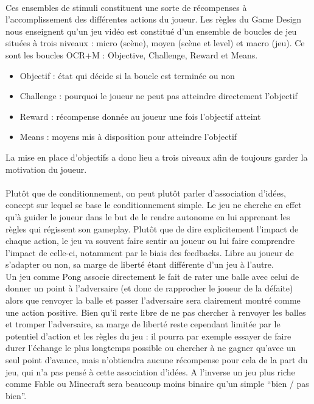 \paragraph{}
Ces ensembles de stimuli constituent une sorte de récompenses à l’accomplissement des différentes actions du joueur. Les règles du Game Design nous enseignent qu’un jeu vidéo est constitué d’un ensemble de boucles de jeu situées à trois niveaux : micro (scène), moyen (scène et level) et macro (jeu). Ce sont les boucles OCR+M : Objective, Challenge, Reward et Means.
\begin{itemize}
	\item Objectif : état qui décide si la boucle est terminée ou non
	\item Challenge : pourquoi le joueur ne peut pas atteindre directement l’objectif
	\item Reward : récompense donnée au joueur une fois l’objectif atteint
	\item Means : moyens mis à disposition pour atteindre l’objectif
\end{itemize}
La mise en place d’objectifs a donc lieu a trois niveaux afin de toujours garder la motivation du joueur.

\paragraph{}
Plutôt que de conditionnement, on peut plutôt parler d’association d’idées, concept sur lequel se base le conditionnement simple. Le jeu ne cherche en effet qu’à guider le joueur dans le but de le rendre autonome en lui apprenant les règles qui régissent son gameplay. Plutôt que de dire explicitement l’impact de chaque action, le jeu va souvent faire sentir au joueur ou lui faire comprendre l’impact de celle-ci, notamment par le biais des feedbacks. Libre au joueur de s’adapter ou non, sa marge de liberté étant différente d’un jeu à l’autre.\\
Un jeu comme Pong associe directement le fait de rater une balle avec celui de donner un point à l’adversaire (et donc de rapprocher le joueur de la défaite) alors que renvoyer la balle et passer l’adversaire sera clairement montré comme une action positive. Bien qu’il reste libre de ne pas chercher à renvoyer les balles et tromper l’adversaire, sa marge de liberté reste cependant limitée par le potentiel d’action et les règles du jeu : il pourra par exemple essayer de faire durer l’échange le plus longtemps possible ou chercher à ne gagner qu’avec un seul point d’avance, mais n’obtiendra aucune récompense pour cela de la part du jeu, qui n’a pas pensé à cette association d’idées. A l’inverse un jeu plus riche comme Fable ou Minecraft sera beaucoup moins binaire qu’un simple “bien / pas bien”.

